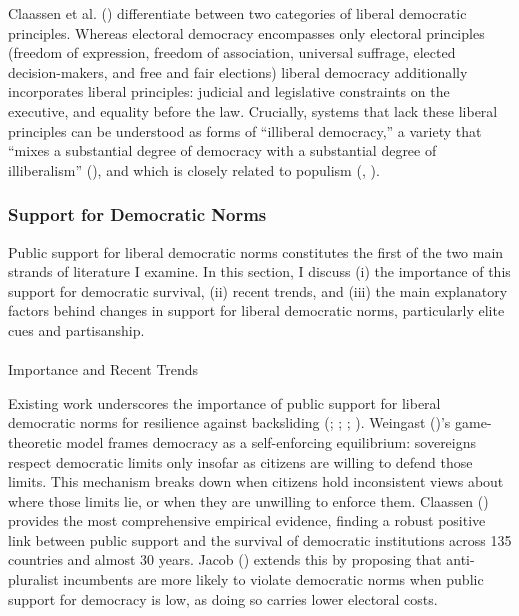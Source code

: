 \documentclass[
  10pt,
  letterpaper,
  DIV=11,
  numbers=noendperiod]{scrartcl}
\makeatletter
\let\oldparagraph\paragraph
\renewcommand{\paragraph}{
    \@ifstar
      \xxxParagraphStar
      \xxxParagraphNoStar
  }
\newcommand{\xxxParagraphStar}[1]{\oldparagraph*{#1}\mbox{}}
\newcommand{\xxxParagraphNoStar}[1]{\oldparagraph{#1}\mbox{}}
\makeatother
\begin{document}
Claassen et al. () differentiate
between two categories of liberal democratic principles. Whereas
electoral democracy encompasses only electoral principles (freedom of
expression, freedom of association, universal suffrage, elected
decision-makers, and free and fair elections) liberal democracy
additionally incorporates liberal principles: judicial and legislative
constraints on the executive, and equality before the law. Crucially,
systems that lack these liberal principles can be understood as forms of
``illiberal democracy,'' a variety that ``mixes a substantial degree of
democracy with a substantial degree of illiberalism''
(), and which is closely
related to populism (,
).

\subsubsection{Support for Democratic
Norms}\label{support-for-democratic-norms}

Public support for liberal democratic norms constitutes the first of the
two main strands of literature I examine. In this section, I discuss (i)
the importance of this support for democratic survival, (ii) recent
trends, and (iii) the main explanatory factors behind changes in support
for liberal democratic norms, particularly elite cues and partisanship.

\paragraph{Importance and Recent
Trends}\label{importance-and-recent-trends}

Existing work underscores the importance of public support for liberal
democratic norms for resilience against backsliding
(;
; ; ). Weingast
()'s game-theoretic model frames
democracy as a self-enforcing equilibrium: sovereigns respect democratic
limits only insofar as citizens are willing to defend those limits. This
mechanism breaks down when citizens hold inconsistent views about where
those limits lie, or when they are unwilling to enforce them. Claassen
() provides the most comprehensive
empirical evidence, finding a robust positive link between public
support and the survival of democratic institutions across 135 countries
and almost 30 years. Jacob () extends this
by proposing that anti-pluralist incumbents are more likely to violate
democratic norms when public support for democracy is low, as doing so
carries lower electoral costs.
\end{document}
